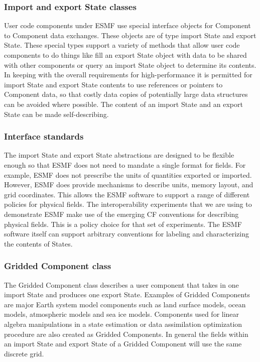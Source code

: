 \subsubsection{Import and export State classes}
User code components under ESMF use special interface objects for Component to 
Component data exchanges. These objects are of type import State and export 
State. These special types support a variety of methods that allow user code 
components to do things like fill an export State object with data to be shared 
with other components or query an import State object to determine its contents. 
In keeping with the overall requirements for high-performance it is permitted 
for import State and export State contents to use references or pointers to 
Component data, so that costly data copies of potentially large data structures 
can be avoided where possible. The content of an import State and an export 
State can be made self-describing.

\subsubsection{Interface standards}
The import State and export State abstractions are designed to be flexible 
enough so that ESMF does not need to mandate a single format for fields. For 
example, ESMF does not prescribe the units of quantities exported or imported. 
However, ESMF does provide mechanisms to describe units, memory layout, and 
grid coordinates.  This allows the ESMF software to support a range of different 
policies for physical fields. The interoperability experiments that we are using 
to demonstrate ESMF make use of the emerging CF conventions \cite{ref:CF} for 
describing physical fields. This is a policy choice for that set of experiments. 
The ESMF software itself can support arbitrary conventions for labeling and 
characterizing the contents of States.

\subsubsection{Gridded Component class}
The Gridded Component class describes a user component that takes in one import State and produces one
export State. Examples of Gridded Components are major Earth system 
model components such as land surface models, ocean models, atmospheric models and sea ice models. Components 
used for linear algebra manipulations in a state estimation or data assimilation optimization procedure are also 
created as Gridded Components. In general the fields within an import State and export State of a Gridded Component will 
use the same discrete grid.

